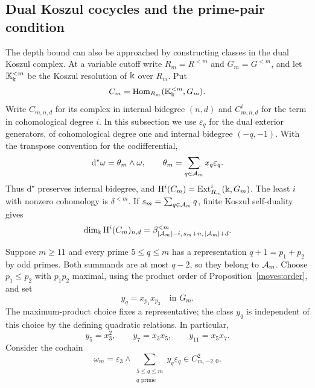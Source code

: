 \subsection{Dual Koszul cocycles and the prime-pair condition}
\label{depth:dual-cocycles}

The depth bound can also be approached by constructing classes in the
dual Koszul complex. At a variable cutoff write $R_m=R^{<m}$ and
$G_m=G^{<m}$, and let $\mathbb K_{\Bbbk}^{<m}$ be the Koszul resolution of
$\Bbbk$ over $R_m$. Put
\[
 C_m=\operatorname{Hom}_{R_m}(\mathbb K_{\Bbbk}^{<m},G_m).
\]
Write $C_{m,n,d}$ for its complex in internal bidegree $(n,d)$ and
$C^i_{m,n,d}$ for the term in cohomological degree $i$.
In this subsection we use $\varepsilon_q$ for the dual exterior
generators, of cohomological degree one and internal bidegree
$(-q,-1)$. With the transpose convention for the codifferential,
\[
 \mathrm{d}^\star\omega=\theta_m\wedge\omega,
 \qquad \theta_m=\sum_{q\in\mathcal A_m}x_q\varepsilon_q.
\]
Thus $\mathrm{d}^\star$ preserves internal bidegree, and
$\mathrm H^i(C_m)=\operatorname{Ext}_{R_m}^i(\Bbbk,G_m)$.
The least $i$ with nonzero cohomology is $\delta^{<m}$.
If $s_m=\sum_{q\in\mathcal A_m}q$, finite Koszul self-duality gives
\begin{equation}\label{depth:dual-betti}
 \dim_\Bbbk\mathrm H^i(C_m)_{n,d}
 =\beta^{<m}_{|\mathcal A_m|-i,\,s_m+n,\,|\mathcal A_m|+d}.
\end{equation}

Suppose $m\ge11$ and every prime $5\le q\le m$ has a representation
$q+1=p_1+p_2$ by odd primes. Both summands are at most $q-2$, so they
belong to $\mathcal A_m$. Choose $p_1\le p_2$ with $p_1p_2$ maximal, using
the product order of Proposition~\ref{moves:order}, and set
\[
 y_q=x_{p_1}x_{p_2}\quad\text{in }G_m.
\]
The maximum-product choice fixes a representative; the class $y_q$
is independent of this choice by the defining quadratic relations.
In particular,
\[
 y_5=x_3^2,\qquad y_7=x_3x_5,\qquad y_{11}=x_5x_7.
\]
Consider the cochain
\begin{equation}\label{depth:dual-family}
 \omega_m=\varepsilon_3\wedge
       \sum_{\substack{5\le q\le m\\q\text{ prime}}}y_q\varepsilon_q
       \in C^2_{m,-2,0}.
\end{equation}

